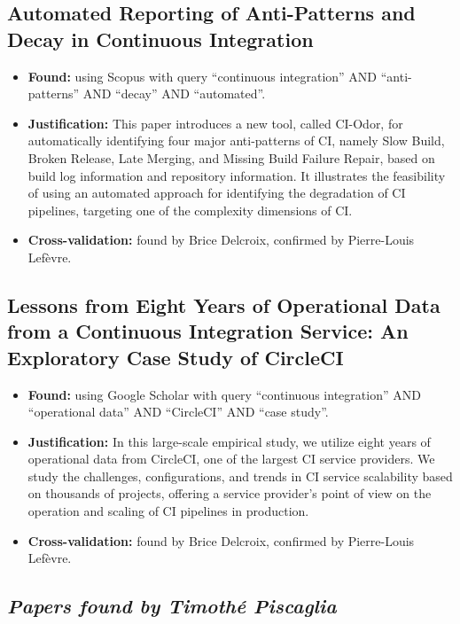 \documentclass[a4paper,11pt,oneside]{article}
\begin{document}
\subsection{Automated Reporting of Anti-Patterns and Decay in Continuous Integration \cite{Vassallo2019}}
%
\begin{itemize}
    \item \textbf{Found:} using Scopus with query ``continuous integration'' AND ``anti-patterns'' AND ``decay'' AND ``automated''.
    \item \textbf{Justification:} This paper introduces a new tool, called CI-Odor, for automatically identifying four major anti-patterns of CI, namely Slow Build, Broken Release, Late Merging, and Missing Build Failure Repair, based on build log information and repository information. It illustrates the feasibility of using an automated approach for identifying the degradation of CI pipelines, targeting one of the complexity dimensions of CI.
    \item \textbf{Cross-validation:} found by Brice Delcroix, confirmed by Pierre-Louis Lef\`{e}vre.
\end{itemize}

\subsection{Lessons from Eight Years of Operational Data from a Continuous Integration Service: An Exploratory Case Study of CircleCI \cite{Gallaba2022}}
%
\begin{itemize}
    \item \textbf{Found:} using Google Scholar with query ``continuous integration'' AND ``operational data'' AND ``CircleCI'' AND ``case study''.
    \item \textbf{Justification:} In this large-scale empirical study, we utilize eight years of operational data from CircleCI, one of the largest CI service providers. We study the challenges, configurations, and trends in CI service scalability based on thousands of projects, offering a service provider’s point of view on the operation and scaling of CI pipelines in production.
    \item \textbf{Cross-validation:} found by Brice Delcroix, confirmed by Pierre-Louis Lef\`{e}vre.
\end{itemize}

\subsection*{\textit{Papers found by Timoth\'{e} Piscaglia}}
\end{document}
